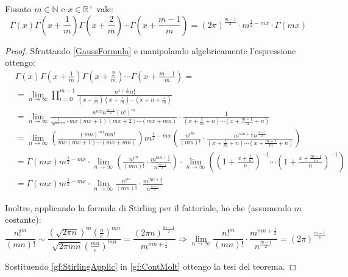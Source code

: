 \begin{theorem}\label{gf:Moltiplicazione}
	Fissato $m\in\mathbb{N}$ e $x\in\mathbb{R^+}$ vale:
	\begin{equation*}
		\Gamma(x)\Gamma\left(x+\frac 1m\right)\Gamma\left(x+\frac 2m\right)\cdots \Gamma\left(x+\frac {m-1}m\right)=
		(2\pi)^{\frac{m-1}2}\cdot m^{\frac12-mx}\cdot\Gamma(mx)
	\end{equation*}
\end{theorem}
\begin{proof}
	Sfruttando \cref{GaussFormula} e manipolando algebricamente l'espressione ottengo:
	\begin{equation}\begin{split}\label{gf:ContMolt}
		&\Gamma(x)\Gamma\left(x+\frac 1m\right)\Gamma\left(x+\frac 2m\right)\cdots \Gamma\left(x+\frac {m-1}m\right) =\\
		&=\lim_{n\to\infty} \prod_{i=0}^{m-1}\frac{n^{x+\frac im}n!}
		{\left(x+\frac im\right)\left(x+\frac im\right)\cdots \left(x+n+\frac im\right)}\\
		&=\lim_{n\to\infty}\frac{n^{mx}n^{\frac{m-1}2}(n!)^m}{\frac 1{m^{mn+1}}\cdot mx(mx+1)(mx+2)\cdots (mx+mn)}\cdot 
		\frac1 {\left(x+\frac 1m+n\right)\cdots \left(x+\frac {m-1}m+n\right)}\\
		&=\lim_{n\to\infty}\left(\frac{(mn)^{mx}mn!}{mx(mx+1)\cdots(mx+mn)}\right)m^{\frac12-mx}
		\left(\frac{n!^m}{(mn)!}\cdot\frac{m^{mn+\frac12}n^{\frac{m-1}2}}
		{\left(x+\frac 1m+n\right)\cdots \left(x+\frac {m-1}m+n\right)}\right)\\
		&=\Gamma(mx)m^{\frac12-mx} \cdot \lim_{n\to\infty} \left( \frac{n!^m}{(mn)!}\cdot 
		\frac{m^{mn+\frac12}}{n^{\frac{m-1}2}}\right)\cdot 
		\lim_{n\to\infty}\left( \left( 1+\frac{x+\frac{1}m}{n}\right)^{-1}
		\cdots \left( 1+\frac{x+\frac{m-1}m}{n}\right)^{-1}\right) \\
		&=\Gamma(mx)m^{\frac12-mx} \cdot \lim_{n\to\infty}\frac{n!^m}{(mn)!}\cdot \frac{m^{mn+\frac12}}{n^{\frac{m-1}2}}
	\end{split}\end{equation}
	
	Inoltre, applicando la formula di Stirling per il fattoriale, ho che (assumendo $m$ costante):
	\begin{equation}\label{gf:StirlingApplic}
		\frac{n!^m}{(mn)!}\sim\frac{\left(\sqrt{2\pi n}\right)^m\left(\frac ne\right)^{mn}}{\sqrt{2\pi mn}\left(\frac{mn}e\right)^{mn}}
		=\frac{(2\pi n)^{\frac{m-1}2}}{m^{mn+\frac12}}\Rightarrow 
		\lim_{n\to\infty}\frac{n!^m}{(mn)!}\cdot \frac{m^{mn+\frac12}}{n^{\frac{m-1}2}}=(2\pi)^{\frac{m-1}2}
	\end{equation}
	
	Sostituendo \cref{gf:StirlingApplic} in \cref{gf:ContMolt} ottengo la tesi del teorema.
\end{proof}

